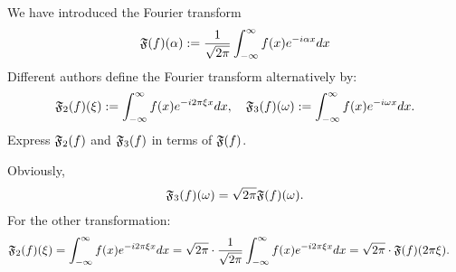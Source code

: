 \documentclass[11pt]{article}
\begin{document}
\begin{exercise}[Extra]
    We have introduced the Fourier transform 
    \begin{align*}
        \mathfrak{F}(f)(\alpha) := \frac{1}{\sqrt{2\pi}}\int_{-\infty}^{\infty} f(x) e^{-i \alpha x} dx
    \end{align*}
    Different authors define the Fourier transform alternatively by:
    \begin{align*}
        \mathfrak{F}_2(f)(\xi) 
        := \int_{-\infty}^{\infty} f(x) e^{-i 2\pi \xi x} dx
        ,
        \quad 
        \mathfrak{F}_3(f)(\omega) 
        := \int_{-\infty}^{\infty} f(x) e^{-i \omega x} dx
        .
    \end{align*}
    Express $\mathfrak{F}_{2}(f)$ and $\mathfrak{F}_{3}(f)$ in terms of $\mathfrak{F}(f)$.
\end{exercise}
\begin{solution}    
    Obviously, 
    \begin{align*}
        \mathfrak{F}_{3}(f)(\omega) = \sqrt{2\pi} \mathfrak{F}(f)(\omega).
    \end{align*}
    For the other transformation:
    \begin{align*}
        \mathfrak{F}_2(f)(\xi) 
        &
        = 
        \int_{-\infty}^{\infty} f(x) e^{-i 2\pi \xi x} dx
        = 
        \sqrt{2\pi} 
        \cdot 
        \frac{1}{\sqrt{2\pi}}
        \int_{-\infty}^{\infty} f(x) e^{-i 2\pi \xi x} dx
        = 
        \sqrt{2\pi} 
        \cdot 
        \mathfrak{F}(f)( 2\pi \xi )
        .
    \end{align*}
\end{solution}
\end{document}
